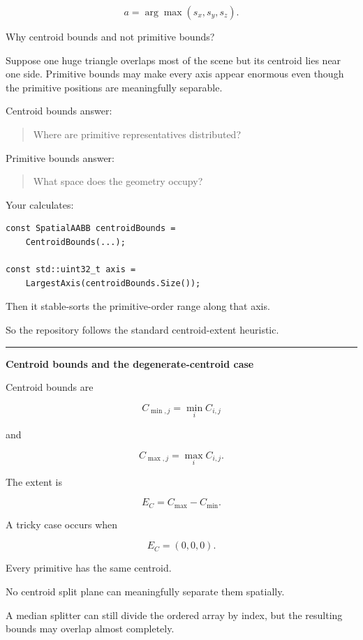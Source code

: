 \[
a=\arg\max(s_x,s_y,s_z).
\]

Why centroid bounds and not primitive bounds?

Suppose one huge triangle overlaps most of the scene but its centroid lies near one side. Primitive bounds may make every axis appear enormous even though the primitive positions are meaningfully separable.

Centroid bounds answer:

\begin{quote}
Where are primitive representatives distributed?
\end{quote}

Primitive bounds answer:

\begin{quote}
What space does the geometry occupy?
\end{quote}

Your  calculates:

\begin{verbatim}
const SpatialAABB centroidBounds =
    CentroidBounds(...);

const std::uint32_t axis =
    LargestAxis(centroidBounds.Size());
\end{verbatim}

Then it stable-sorts the primitive-order range along that axis.

So the repository follows the standard centroid-extent heuristic.

\begin{center}\rule{0.5\linewidth}{0.5pt}\end{center}

\textbf{Centroid bounds and the degenerate-centroid case}

Centroid bounds are

\[
C_{\min,j}
=
\min_i C_{i,j}
\]

and

\[
C_{\max,j}
=
\max_i C_{i,j}.
\]

The extent is

\[
E_C=C_{\max}-C_{\min}.
\]

A tricky case occurs when

\[
E_C=(0,0,0).
\]

Every primitive has the same centroid.

No centroid split plane can meaningfully separate them spatially.

A median splitter can still divide the ordered array by index, but the resulting bounds may overlap almost completely.

